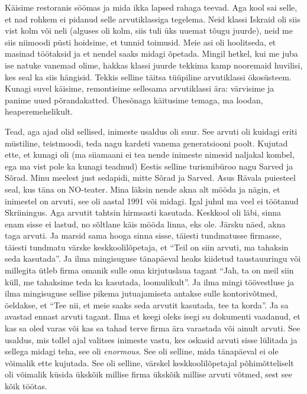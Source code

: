 Käisime restoranis söömas ja mida ikka lapsed rahaga teevad. Aga kool sai 
selle, et nad rohkem ei pidanud selle arvutiklassiga tegelema. Neid klassi  
Iskraid oli 
siis vist kolm või neli (alguses oli kolm, siis tuli üks uuemat tõugu juurde), 
neid me siis niimoodi püsti hoidsime, et tunnid toimusid. Meie asi 
oli hoolitseda, et masinad töötaksid ja et nendel saaks midagi õpetada. Mingil 
hetkel, kui me juba ise natuke vanemad olime, hakkas klassi juurde tekkima 
kamp nooremaid huvilisi, kes seal ka siis hängisid. Tekkis selline 
täitsa tüüpiline arvutiklassi ökosüsteem. Kunagi suvel käisime, remontisime sellesama 
arvutiklassi ära: värvisime ja panime uued põrandakatted. Ühesõnaga käitusime temaga, 
ma loodan, heaperemehelikult. 


Tead, aga ajad olid sellised, inimeste usaldus oli suur. See arvuti oli kuidagi eriti müstiline, teistmoodi, teda nagu kardeti vanema 
generatsiooni poolt. Kujutad ette, et kunagi oli (ma siiamaani ei tea nende inimeste 
nimesid naljakal kombel, ega ma vist pole ka kunagi teadnud) 
Eestis selline turismibüroo nagu Sarved ja Sõrad. Minu 
meelest just sedapidi, mitte Sõrad ja Sarved. Asus Rävala puiesteel seal, kus 
täna on NO-teater. Mina läksin nende akna alt  
 mööda ja nägin, et inimestel on 
arvuti, see oli aastal 1991 või midagi. Igal juhul ma veel ei töötanud 
Skriiningus. Aga arvutit tahtsin hirmsasti kasutada. Keskkool 
oli läbi, sinna enam sisse ei lastud,  no sõltlane käis mööda linna, eks ole. 
Järsku näed, akna taga arvuti. Ja marsid sama hooga sinna sisse, täiesti 
tundmatusse firmasse, täiesti tundmatu värske keskkoolilõpetaja, et 
\enquote{Teil on siin arvuti, ma tahaksin seda kasutada}. Ja ilma mingisuguse 
tänapäeval heaks kiidetud taustauuringu või millegita ütleb firma omanik sulle 
oma kirjutuslaua tagant \enquote{Jah, ta on meil siin küll, me tahaksime teda ka 
kasutada, loomulikult}. Ja ilma mingi töövestluse ja ilma mingisuguse sellise 
pikema jutuajamiseta antakse sulle kontorivõtmed, öeldakse, et \enquote{Tee 
nii, et meie saaks seda arvutit kasutada, tee ta korda}. Ja sa avastad ennast  
arvuti tagant. Ilma et keegi oleks isegi su dokumenti vaadanud, et kas sa oled 
varas või kas sa tahad terve firma ära varastada või 
ainult arvuti. See usaldus, mis tollel ajal valitses inimeste vastu, kes 
oskasid arvuti sisse lülitada ja sellega midagi teha, see oli \emph{enormous}.\label{sisu:andrus_usaldus} 
See oli selline, mida tänapäeval ei ole võimalik ette kujutada. See oli 
selline, värskel keskkoolilõpetajal  
põhimõtteliselt oli võimalik küsida ükskõik millise firma ükskõik millise  
arvuti võtmed, sest see kõik töötas. 

